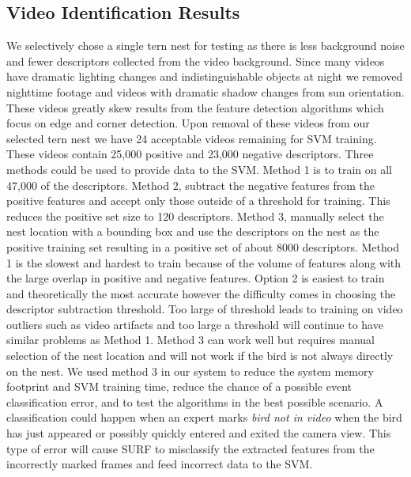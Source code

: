 \subsection{Video Identification Results}
\label{sec:inital_test}

We selectively chose a single tern nest for testing as there is less background noise and fewer descriptors collected from the video background. Since many videos have dramatic lighting changes and indistinguishable objects at night we removed nighttime footage and videos with dramatic shadow changes from sun orientation. These videos greatly skew results from the feature detection algorithms which focus on edge and corner detection. Upon removal of these videos from our selected tern nest we have 24 acceptable videos remaining for SVM training. These videos contain 25,000 positive and 23,000 negative descriptors. Three methods could be used to provide data to the SVM\@. Method 1 is to train on all 47,000 of the descriptors. Method 2, subtract the negative features from the positive features and accept only those outside of a threshold for training. This reduces the positive set size to 120 descriptors. Method 3, manually select the nest location with a bounding box and use the descriptors on the nest as the positive training set resulting in a positive set of about 8000 descriptors. Method 1 is the slowest and hardest to train because of the volume of features along with the large overlap in positive and negative features. Option 2 is easiest to train and theoretically the most accurate however the difficulty comes in choosing the descriptor subtraction threshold. Too large of threshold leads to training on video outliers such as video artifacts and too large a threshold will continue to have similar problems as Method 1. Method 3 can work well but requires manual selection of the nest location and will not work if the bird is not always directly on the nest. We used method 3 in our system to reduce the system memory footprint and SVM training time, reduce the chance of a possible event classification error, and to test the algorithms in the best possible scenario. A classification could happen when an expert marks \emph{bird not in video} when the bird has just appeared or possibly quickly entered and exited the camera view. This type of error will cause SURF to misclassify the extracted features from the incorrectly marked frames and feed incorrect data to the SVM\@.

